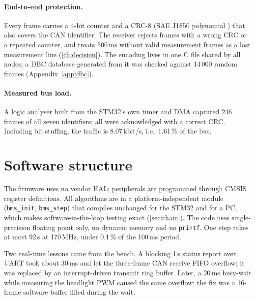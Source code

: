 \paragraph{End-to-end protection.} Every frame carries a 4-bit counter and a CRC-8 (SAE J1850 polynomial \citep{sae_j1850}) that also covers the CAN identifier. The receiver rejects frames with a wrong CRC or a repeated counter, and treats 500\,ms without valid measurement frames as a lost measurement line (\cref{ch:decision}). The encoding lives in one C file shared by all nodes; a DBC database generated from it was checked against 14\,000 random frames (Appendix~\ref{app:dbc}).

\paragraph{Measured bus load.} A logic analyser built from the STM32's own timer and DMA captured 246 frames of all seven identifiers; all were acknowledged with a correct CRC. Including bit stuffing, the traffic is 8.07\,kbit/s, i.e.\ 1.61\,\% of the bus.


\section{Software structure}
The firmware uses no vendor HAL; peripherals are programmed through CMSIS register definitions. All algorithms are in a platform-independent module (\texttt{bms\_init}, \texttt{bms\_step}) that compiles unchanged for the STM32 and for a PC, which makes software-in-the-loop testing exact (\cref{sec:chain}). The code uses single-precision floating point only, no dynamic memory and no \texttt{printf}. One step takes at most 92\,\textmu s at 170\,MHz, under 0.1\,\% of the 100\,ms period.

Two real-time lessons came from the bench. A blocking 1\,s status report over UART took about 30\,ms and let the three-frame CAN receive FIFO overflow; it was replaced by an interrupt-driven transmit ring buffer. Later, a 20\,ms busy-wait while measuring the headlight PWM caused the same overflow; the fix was a 16-frame software buffer filled during the wait.
